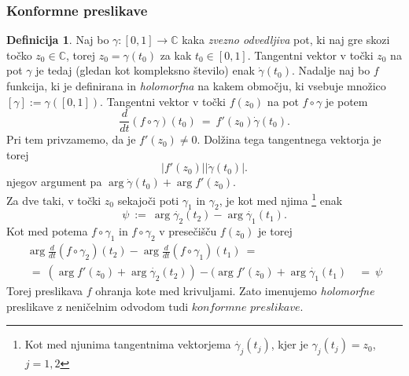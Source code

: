 \documentclass[11pt]{article}
\theoremstyle{definition}
\newtheorem{definicija}{Definicija}[section]
\theoremstyle{definition}
\theoremstyle{definition}
\begin{document}

\subsubsection{Konformne preslikave}

\begin{definicija}

Naj bo $\gamma: [0,1] \rightarrow \mathbb{C}$ kaka \textit{zvezno odvedljiva} pot, ki naj gre skozi točko $z_0 \in \mathbb{C}$, torej $z_0 = \gamma(t_0)$ za kak $t_0 \in [0,1]$. Tangentni vektor v točki $z_0$ na pot $\gamma$ je tedaj (gledan kot kompleksno število) enak $\dot{\gamma}(t_0)$. Nadalje naj bo $f$ funkcija, ki je definirana in \textit{holomorfna} na kakem območju, ki vsebuje množico $[\gamma] := \gamma([0,1])$. Tangentni vektor v točki $f(z_0)$ na pot $f \circ \gamma$ je potem 
$$\frac{d}{dt}\left( f \circ \gamma \right)(t_0) ~=~ f'(z_0) \dot{\gamma}(t_0).$$
Pri tem privzamemo, da je $f'(z_0) \neq 0$. Dolžina tega tangentnega vektorja je torej $$|f'(z_0)||\dot{\gamma}(t_0)|.$$
njegov argument pa $\arg{\dot{\gamma}(t_0)} + \arg{f'(z_0)}$. \\

\noindent Za dve taki, v točki $z_0$ sekajoči poti $\gamma_1$ in $\gamma_2$, je kot med njima \footnote{Kot med njunima tangentnima vektorjema $\dot{\gamma_j}(t_j)$, kjer je $\gamma_j(t_j) = z_0$, $j = 1, 2$} enak 
$$\psi ~:=~ \arg{\dot{\gamma_2}(t_2)} - \arg{\dot{\gamma_1}(t_1)}.$$
Kot med potema $f \circ \gamma_1$ in $f \circ \gamma_2$ v presečišču $f(z_0)$ je torej
\begin{align*}
\arg{\frac{d}{dt}\left( f \circ \gamma_2 \right)(t_2)} - \arg{\frac{d}{dt}\left( f \circ \gamma_1 \right)(t_1)} ~=~ \\ 
~=~ (\arg{f'(z_0)} + \arg{\dot{\gamma_2}(t_2)}) - (\arg{f'(z_0)} + \arg{\dot{\gamma_1}(t_1)} ~&=~ \psi
\end{align*}
Torej preslikava $f$ ohranja kote med krivuljami. Zato imenujemo \textit{holomorfne} preslikave z neničelnim odvodom tudi $\textit{konformne preslikave}$.

\end{definicija}
\vspace{0.5cm}


\end{document}
